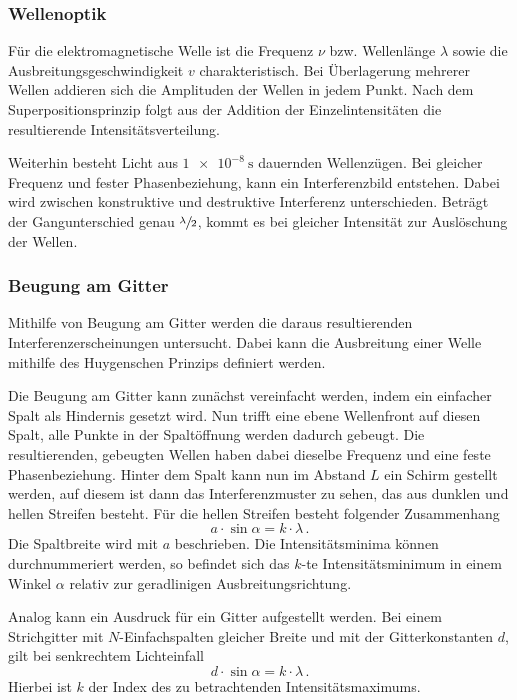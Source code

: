    \subsubsection*{Wellenoptik}
        Für die elektromagnetische Welle ist die Frequenz $\nu$ bzw. Wellenlänge $\lambda$ sowie die Ausbreitungsgeschwindigkeit $v$ charakteristisch.
        Bei Überlagerung mehrerer Wellen addieren sich die Amplituden der Wellen in jedem Punkt.
        Nach dem Superpositionsprinzip folgt aus der Addition der Einzelintensitäten die resultierende Intensitätsverteilung.

        \noindent
        Weiterhin besteht Licht aus $\SI{1e-8}{\second}$ dauernden Wellenzügen.
        Bei gleicher Frequenz und fester Phasenbeziehung, kann ein Interferenzbild entstehen.
        Dabei wird zwischen konstruktive und destruktive Interferenz unterschieden.
        Beträgt der Gangunterschied genau $\sfrac{\lambda}{2}$, kommt es bei gleicher Intensität zur Auslöschung der Wellen.

    \subsubsection*{Beugung am Gitter}
        Mithilfe von Beugung am Gitter werden die daraus resultierenden Interferenzerscheinungen untersucht.
        Dabei kann die Ausbreitung einer Welle mithilfe des Huygenschen Prinzips definiert werden.

        \noindent
        Die Beugung am Gitter kann zunächst vereinfacht werden, indem ein einfacher Spalt als Hindernis gesetzt wird.
        Nun trifft eine ebene Wellenfront auf diesen Spalt, alle Punkte in der Spaltöffnung werden dadurch gebeugt.
        Die resultierenden, gebeugten Wellen haben dabei dieselbe Frequenz und eine feste Phasenbeziehung.
        Hinter dem Spalt kann nun im Abstand $L$ ein Schirm gestellt werden, auf diesem ist dann das Interferenzmuster zu sehen, das aus dunklen und hellen Streifen besteht.
        Für die hellen Streifen besteht folgender Zusammenhang
        \begin{equation*}
            a \cdot \sin \alpha = k \cdot \lambda \, .
        \end{equation*}
        Die Spaltbreite wird mit $a$ beschrieben.
        Die Intensitätsminima können durchnummeriert werden, so befindet sich das $k$-te Intensitätsminimum in einem Winkel $\alpha$ relativ zur geradlinigen Ausbreitungsrichtung.

        \noindent
        Analog kann ein Ausdruck für ein Gitter aufgestellt werden.
        Bei einem Strichgitter mit $N$-Einfachspalten gleicher Breite und mit der Gitterkonstanten $d$, gilt bei senkrechtem Lichteinfall
        \begin{equation*}
            d \cdot \sin \alpha = k \cdot \lambda \, .
        \end{equation*}
        Hierbei ist $k$ der Index des zu betrachtenden Intensitätsmaximums.